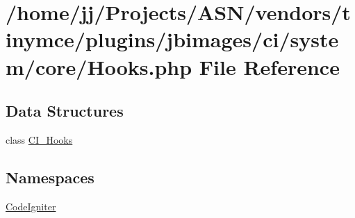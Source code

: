 \hypertarget{_hooks_8php}{}\section{/home/jj/\+Projects/\+A\+S\+N/vendors/tinymce/plugins/jbimages/ci/system/core/\+Hooks.php File Reference}
\label{_hooks_8php}
\subsection*{Data Structures}
\begin{DoxyCompactItemize}
\item 
class \hyperlink{class_c_i___hooks}{C\+I\+\_\+\+Hooks}
\end{DoxyCompactItemize}
\subsection*{Namespaces}
\begin{DoxyCompactItemize}
\item 
 \hyperlink{namespace_code_igniter}{Code\+Igniter}
\end{DoxyCompactItemize}
